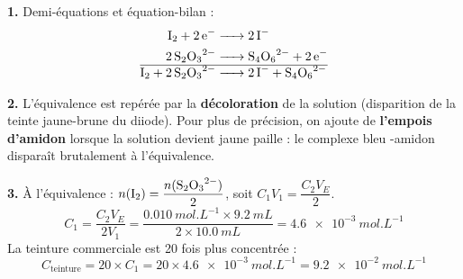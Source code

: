 \documentclass[11pt]{article}
\begin{document}
\begin{corrige}
\textbf{1.} Demi-équations et équation-bilan :
\begin{align*}
\ce{I2 + 2e- &-> 2I-} \\
\ce{2S2O3^2- &-> S4O6^2- + 2e-} \\ \hline
\ce{I2 + 2S2O3^2- &-> 2I- + S4O6^2-}
\end{align*}

\textbf{2.} L'équivalence est repérée par la \textbf{décoloration} de la solution (disparition de la teinte jaune-brune du diiode). Pour plus de précision, on ajoute de \textbf{l'empois d'amidon} lorsque la solution devient jaune paille : le complexe bleu -amidon disparaît brutalement à l'équivalence.

\textbf{3.} À l'équivalence : $n(\ce{I2}) = \dfrac{n(\ce{S2O3^2-})}{2}$, soit $C_1 V_1 = \dfrac{C_2 V_E}{2}$.
\[ C_1 = \frac{C_2 V_E}{2 V_1} = \frac{\SI{0,010}{mol.L^{-1}} \times \SI{9,2}{mL}}{2 \times \SI{10,0}{mL}} = \SI{4,6e-3}{mol.L^{-1}} \]
La teinture commerciale est 20 fois plus concentrée :
\[ C_{\text{teinture}} = 20 \times C_1 = 20 \times \SI{4,6e-3}{mol.L^{-1}} = \SI{9,2e-2}{mol.L^{-1}} \]
\end{corrige}
\end{document}
